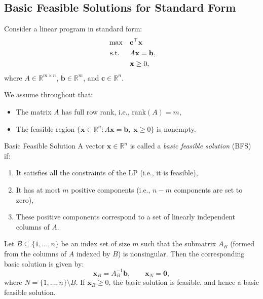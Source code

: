 \subsection{Basic Feasible Solutions for Standard Form}

Consider a linear program in standard form:
\[
\begin{aligned}
\max \quad & \mathbf{c}^\top \mathbf{x} \\
\mbox{ s.t. } \quad & A \mathbf{x} = \mathbf{b}, \\
& \mathbf{x} \geq 0,
\end{aligned}
\]
where \( A \in \mathbb{R}^{m \times n} \), \( \mathbf{b} \in \mathbb{R}^m \), and \( \mathbf{c} \in \mathbb{R}^n \).

\smallskip

We assume throughout that:
\begin{itemize}
    \item The matrix \( A \) has full row rank, i.e., \( \text{rank}(A) = m \),
    \item The feasible region \( \{ \mathbf{x} \in \mathbb{R}^n : A\mathbf{x} = \mathbf{b}, \; \mathbf{x} \geq 0 \} \) is nonempty.
\end{itemize}

\smallskip

\begin{definition}{Basic Feasible Solution} A vector \( \mathbf{x} \in \mathbb{R}^n \) is called a \emph{basic feasible solution} (BFS) if:
\begin{enumerate}
    \item It satisfies all the constraints of the LP (i.e., it is feasible),
    \item It has at most \( m \) positive components (i.e., \( n - m \) components are set to zero),
    \item These positive components correspond to a set of linearly independent columns of \( A \).
\end{enumerate}

\smallskip

Let \( B \subseteq \{1, \dots, n\} \) be an index set of size \( m \) such that the submatrix \( A_B \) (formed from the columns of \( A \) indexed by \( B \)) is nonsingular. Then the corresponding basic solution is given by:
\[
\mathbf{x}_B = A_B^{-1} \mathbf{b}, \qquad \mathbf{x}_N = \mathbf{0},
\]
where \( N = \{1, \dots, n\} \setminus B \). If \( \mathbf{x}_B \geq 0 \), the basic solution is feasible, and hence a basic feasible solution.
\end{definition}
\smallskip

